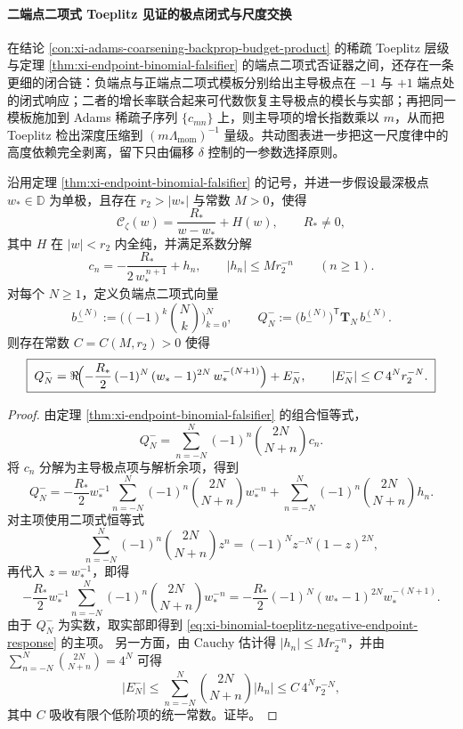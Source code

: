 \paragraph{二端点二项式 Toeplitz 见证的极点闭式与尺度交换}
在结论 \ref{con:xi-adams-coarsening-backprop-budget-product} 的稀疏 Toeplitz 层级与定理 \ref{thm:xi-endpoint-binomial-falsifier} 的端点二项式否证器之间，还存在一条更细的闭合链：负端点与正端点二项式模板分别给出主导极点在 \(-1\) 与 \(+1\) 端点处的闭式响应；二者的增长率联合起来可代数恢复主导极点的模长与实部；再把同一模板施加到 Adams 稀疏子序列 \(\{c_{mn}\}\) 上，则主导项的增长指数乘以 \(m\)，从而把 Toeplitz 检出深度压缩到 \((m\Lambda_{\mathrm{mom}})^{-1}\) 量级。共动图表进一步把这一尺度律中的高度依赖完全剥离，留下只由偏移 \(\delta\) 控制的一参数选择原则。

\begin{theorem}\label{thm:xi-binomial-toeplitz-dominant-pole-response}
沿用定理 \ref{thm:xi-endpoint-binomial-falsifier} 的记号，并进一步假设最深极点 \(w_\ast\in\mathbb D\) 为单极，且存在 \(r_2>|w_\ast|\) 与常数 \(M>0\)，使得
\[
\mathscr C_{\zeta}(w)=\frac{R_\ast}{w-w_\ast}+H(w),
\qquad
R_\ast\neq 0,
\]
其中 \(H\) 在 \(|w|<r_2\) 内全纯，并满足系数分解
\[
c_n=-\frac{R_\ast}{2\,w_\ast^{\,n+1}}+h_n,
\qquad
|h_n|\le M r_2^{-n}
\qquad(n\ge 1).
\]
对每个 \(N\ge 1\)，定义负端点二项式向量
\[
b_-^{(N)}:=\bigl((-1)^k\binom Nk\bigr)_{k=0}^{N},
\qquad
Q_N^-:=\bigl(b_-^{(N)}\bigr)^{\mathsf T}\mathbf T_N\,b_-^{(N)}.
\]
则存在常数 \(C=C(M,r_2)>0\) 使得
\begin{equation}\label{eq:xi-binomial-toeplitz-negative-endpoint-response}
\boxed{\;
Q_N^-
=
\Re\!\Bigl(
-\frac{R_\ast}{2}\,
(-1)^N\,
(w_\ast-1)^{2N}\,
w_\ast^{-(N+1)}
\Bigr)
+E_N^-,
\qquad
|E_N^-|\le C\,4^N r_2^{-N}.
\;}
\end{equation}
\end{theorem}

\begin{proof}
由定理 \ref{thm:xi-endpoint-binomial-falsifier} 的组合恒等式，
\[
Q_N^-=
\sum_{n=-N}^{N}(-1)^n\binom{2N}{N+n}c_n.
\]
将 \(c_n\) 分解为主导极点项与解析余项，得到
\[
Q_N^-=
-\frac{R_\ast}{2}w_\ast^{-1}
\sum_{n=-N}^{N}(-1)^n\binom{2N}{N+n}w_\ast^{-n}
+
\sum_{n=-N}^{N}(-1)^n\binom{2N}{N+n}h_n.
\]
对主项使用二项式恒等式
\[
\sum_{n=-N}^{N}(-1)^n\binom{2N}{N+n}z^n
=
(-1)^N z^{-N}(1-z)^{2N},
\]
再代入 \(z=w_\ast^{-1}\)，即得
\[
-\frac{R_\ast}{2}w_\ast^{-1}
\sum_{n=-N}^{N}(-1)^n\binom{2N}{N+n}w_\ast^{-n}
=
-\frac{R_\ast}{2}
(-1)^N
(w_\ast-1)^{2N}
w_\ast^{-(N+1)}.
\]
由于 \(Q_N^-\) 为实数，取实部即得到 \eqref{eq:xi-binomial-toeplitz-negative-endpoint-response} 的主项。
另一方面，由 Cauchy 估计得 \(|h_n|\le M r_2^{-n}\)，并由 \(\sum_{n=-N}^{N}\binom{2N}{N+n}=4^N\) 可得
\[
|E_N^-|
\le
\sum_{n=-N}^{N}\binom{2N}{N+n}|h_n|
\le
C\,4^N r_2^{-N},
\]
其中 \(C\) 吸收有限个低阶项的统一常数。证毕。
\end{proof}

